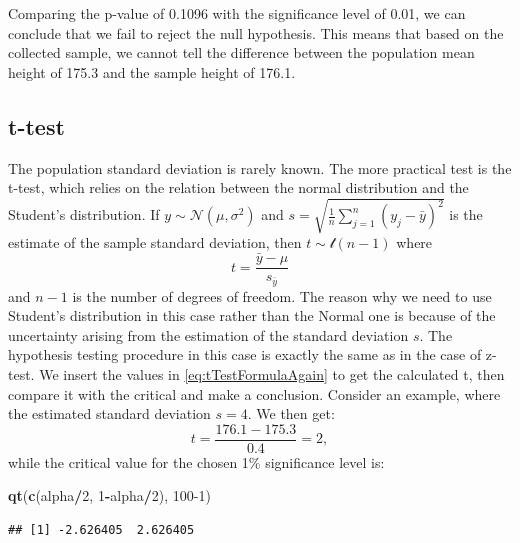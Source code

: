 \documentclass[
]{book}
\newenvironment{Shaded}{\begin{snugshade}}{\end{snugshade}}
\newcommand{\DecValTok}[1]{\textcolor[rgb]{0.00,0.00,0.81}{#1}}
\newcommand{\FunctionTok}[1]{\textcolor[rgb]{0.13,0.29,0.53}{\textbf{#1}}}
\newcommand{\NormalTok}[1]{#1}
\newcommand{\SpecialCharTok}[1]{\textcolor[rgb]{0.81,0.36,0.00}{\textbf{#1}}}
\theoremstyle{definition}
\theoremstyle{definition}
\theoremstyle{definition}
\theoremstyle{definition}
\theoremstyle{remark}
\begin{document}
Comparing the p-value of 0.1096 with the significance level of 0.01, we can conclude that we fail to reject the null hypothesis. This means that based on the collected sample, we cannot tell the difference between the population mean height of 175.3 and the sample height of 176.1.

\subsection{t-test}\label{statisticalTestsOneSampleMeanT}

The population standard deviation is rarely known. The more practical test is the t-test, which relies on the relation between the normal distribution and the Student's distribution. If \(y \sim \mathcal{N}(\mu ,\sigma^2)\) and \(s=\sqrt{\frac{1}{n}\sum_{j=1}^n{\left(y_j-\bar{y}\right)^2}}\) is the estimate of the sample standard deviation, then \(t \sim \mathcal{t}(n-1)\) where
\begin{equation}
    t = \frac{\bar{y}-\mu}{s_{\bar{y}}} 
    \label{eq:tTestFormulaAgain}
\end{equation}
and \(n-1\) is the number of degrees of freedom. The reason why we need to use Student's distribution in this case rather than the Normal one is because of the uncertainty arising from the estimation of the standard deviation \(s\). The hypothesis testing procedure in this case is exactly the same as in the case of z-test. We insert the values in \eqref{eq:tTestFormulaAgain} to get the calculated t, then compare it with the critical and make a conclusion. Consider an example, where the estimated standard deviation \(s=4\). We then get:
\begin{equation*}
    t = \frac{176.1-175.3}{0.4} = 2 ,
\end{equation*}
while the critical value for the chosen 1\% significance level is:

\begin{Shaded}
\begin{Highlighting}[]
\FunctionTok{qt}\NormalTok{(}\FunctionTok{c}\NormalTok{(alpha}\SpecialCharTok{/}\DecValTok{2}\NormalTok{, }\DecValTok{1}\SpecialCharTok{{-}}\NormalTok{alpha}\SpecialCharTok{/}\DecValTok{2}\NormalTok{), }\DecValTok{100{-}1}\NormalTok{)}
\end{Highlighting}
\end{Shaded}

\begin{verbatim}
## [1] -2.626405  2.626405
\end{verbatim}
\end{document}
